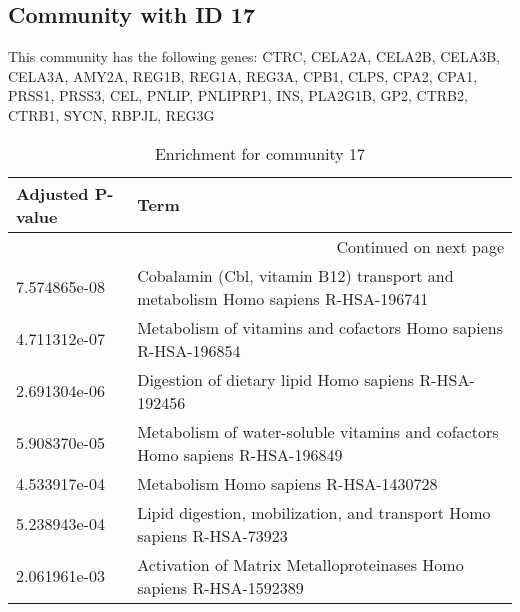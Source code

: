 \subsection*{Community with ID 17}
This community has the following genes: CTRC, CELA2A, CELA2B, CELA3B, CELA3A, AMY2A, REG1B, REG1A, REG3A, CPB1, CLPS, CPA2, CPA1, PRSS1, PRSS3, CEL, PNLIP, PNLIPRP1, INS, PLA2G1B, GP2, CTRB2, CTRB1, SYCN, RBPJL, REG3G
\\
\begin{longtable}{p{2.4cm}p{14.5cm}}
\caption{Enrichment for community 17}\\
\toprule
Adjusted \newline P-value &                                                                             Term \\
\midrule
\endhead
\midrule
\multicolumn{2}{r}{{Continued on next page}} \\
\midrule
\endfoot

\bottomrule
\endlastfoot
             7.574865e-08 &  Cobalamin (Cbl, vitamin B12) transport and metabolism Homo sapiens R-HSA-196741 \\
             4.711312e-07 &                   Metabolism of vitamins and cofactors Homo sapiens R-HSA-196854 \\
             2.691304e-06 &                             Digestion of dietary lipid Homo sapiens R-HSA-192456 \\
             5.908370e-05 &     Metabolism of water-soluble vitamins and cofactors Homo sapiens R-HSA-196849 \\
             4.533917e-04 &                                            Metabolism Homo sapiens R-HSA-1430728 \\
             5.238943e-04 &            Lipid digestion, mobilization, and transport Homo sapiens R-HSA-73923 \\
             2.061961e-03 &               Activation of Matrix Metalloproteinases Homo sapiens R-HSA-1592389 \\
\end{longtable}


